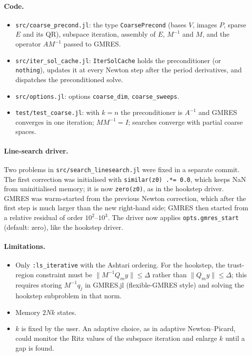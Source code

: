\documentclass[11pt,a4paper]{article}
\begin{document}
\paragraph{Code.}
\begin{itemize}
\item \texttt{src/coarse\_precond.jl}: the type \texttt{CoarsePrecond} (bases $V$, images $P$, sparse $E$ and its QR), subspace iteration, assembly of $E$, $M^{-1}$ and $M$, and the operator $AM^{-1}$ passed to GMRES.
\item \texttt{src/iter\_sol\_cache.jl}: \texttt{IterSolCache} holds the preconditioner (or \texttt{nothing}), updates it at every Newton step after the period derivatives, and dispatches the preconditioned solve.
\item \texttt{src/options.jl}: options \texttt{coarse\_dim}, \texttt{coarse\_sweeps}.
\item \texttt{test/test\_coarse.jl}: with $k = n$ the preconditioner is $A^{-1}$ and GMRES converges in one iteration; $MM^{-1} = I$; searches converge with partial coarse spaces.
\end{itemize}

\paragraph{Line-search driver.} Two problems in \texttt{src/search\_linesearch.jl} were fixed in a separate commit. The first correction was initialised with \texttt{similar(z0) .*= 0.0}, which keeps NaN from uninitialised memory; it is now \texttt{zero(z0)}, as in the hookstep driver. GMRES was warm-started from the previous Newton correction, which after the first step is much larger than the new right-hand side; GMRES then started from a relative residual of order $10^2$--$10^3$. The driver now applies \texttt{opts.gmres\_start} (default: zero), like the hookstep driver.

\paragraph{Limitations.}
\begin{itemize}
\item Only \texttt{:ls\_iterative} with the Ashtari ordering. For the hookstep, the trust-region constraint must be $\|M^{-1}Q_m y\| \le \Delta$ rather than $\|Q_m y\| \le \Delta$; this requires storing $M^{-1}q_j$ in GMRES.jl (flexible-GMRES style) and solving the hookstep subproblem in that norm.
\item Memory $2Nk$ states.
\item $k$ is fixed by the user. An adaptive choice, as in adaptive Newton--Picard, could monitor the Ritz values of the subspace iteration and enlarge $k$ until a gap is found.
\end{itemize}
\end{document}
